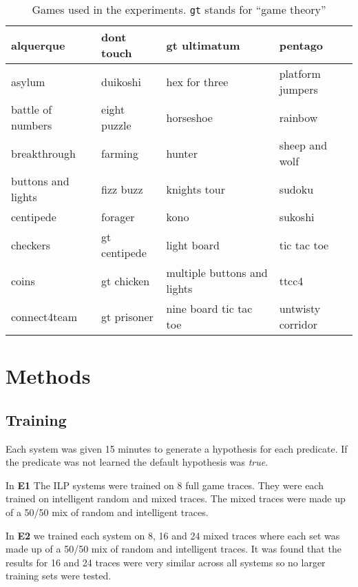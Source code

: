 \begin{table}[]
\begin{tabular}{|l|l|l|l|}
	\hline
	alquerque           & dont touch    & gt ultimatum              & pentago\\ \hline
	asylum              & duikoshi      & hex for   three               & platform jumpers\\ \hline
	battle of numbers   & eight puzzle  & horseshoe                 & rainbow\\ \hline
	breakthrough        & farming       & hunter                    & sheep and wolf\\ \hline
	buttons and lights  & fizz buzz      & knights tour              & sudoku\\ \hline
	centipede           & forager       & kono                      & sukoshi\\ \hline
	checkers            & gt centipede  & light board                & tic tac toe \\ \hline
	coins               & gt chicken    & multiple buttons and lights  & ttcc4 \\ \hline
	connect4team        & gt prisoner   & nine board tic tac toe        & untwisty corridor \\ \hline
\end{tabular}
\caption{Games used in the experiments. \texttt{gt} stands for ``game theory''}
\label{tab:Games}
\end{table}


\section{Methods}
\subsection{Training}

Each system was given 15 minutes to generate a hypothesis for each predicate. If the predicate was not learned the default hypothesis was \textit{true}. 

In \textbf{E1} The ILP systems were trained on 8 full game traces. They were each trained on intelligent random and mixed traces. The mixed traces were made up of a 50/50 mix of random and intelligent traces. 

In \textbf{E2} we trained each system on 8, 16 and 24 mixed traces where each set was made up of a 50/50 mix of random and intelligent traces. It was found that the results for 16 and 24 traces were very similar across all systems so no larger training sets were tested.


